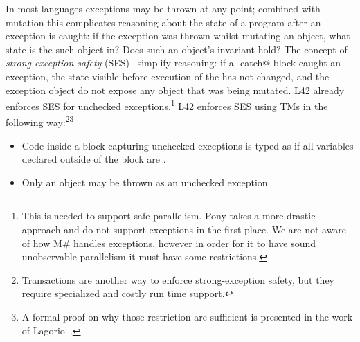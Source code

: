 \loseSpace
{}
In most languages exceptions may be thrown at any point; combined with mutation this complicates reasoning about the state of a program after an exception is caught: if the exception was thrown whilst mutating an object, what state is the such object in? Does such an object's invariant hold?
The concept of \emph{strong exception safety} (SES)~\cite{?} simplify reasoning:
if a \Q@try-catch@ block caught an exception, the state visible before execution of the \Q@try@ has not changed, and the exception object do not expose any object that was being mutated.
L42 already enforces SES for unchecked exceptions.\footnote{
This is needed to support safe parallelism. Pony takes a more drastic approach and do not support exceptions in the first place. 
We are not aware of how M\# handles exceptions, however in order for it to have sound unobservable parallelism it must have some restrictions.
}
L42 enforces SES using TMs in the following way:\footnote{Transactions are another way to enforce strong-exception safety, but they require specialized and costly run time support.}\footnote{A formal proof on why those restriction are sufficient is presented in the work of Lagorio~\cite{?}.}
\begin{itemize}
\item Code inside a \Q@try@ block capturing unchecked exceptions is typed as if all \Q@mut@ variables declared outside of the block are \Q@read@.
\item Only an \Q@imm@ object may be thrown as an unchecked exception.
\end{itemize} 

